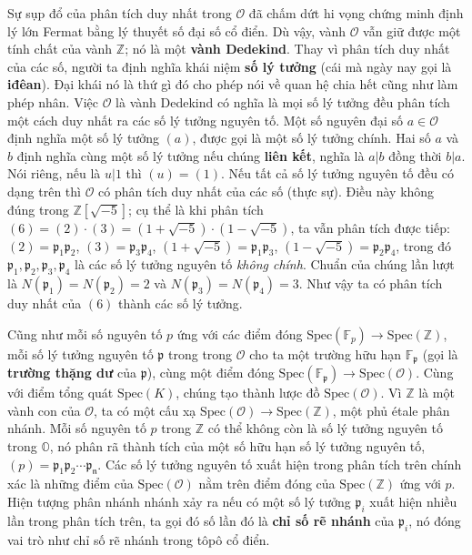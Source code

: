 \documentclass[12pt]{article}
\begin{document}
Sự sụp đổ của phân tích duy nhất trong $\mathcal{O}$ đã chấm dứt hi vọng chứng minh định lý lớn Fermat bằng lý thuyết số đại số cổ điển. Dù vậy, vành $\mathcal{O}$ vẫn giữ được một tính chất của vành $\mathbb{Z}$; nó là một {\bf vành Dedekind}. Thay vì phân tích duy nhất của các số, người ta định nghĩa khái niệm {\bf số lý tưởng} (cái mà ngày nay gọi là {\bf iđêan}). Đại khái nó là thứ gì đó cho phép nói về quan hệ chia hết cũng như làm phép nhân. Việc $\mathcal{O}$ là vành Dedekind có nghĩa là mọi số lý tưởng đều phân tích một cách duy nhất ra các số lý tưởng nguyên tố. Một số nguyên đại số $a \in \mathcal{O}$ định nghĩa một số lý tưởng $(a)$, được gọi là một số lý tưởng chính. Hai số $a$ và $b$ định nghĩa cùng một số lý tưởng nếu chúng {\bf liên kết}, nghĩa là $a|b$ đồng thời $b|a$. Nói riêng, nếu là $u|1$ thì $(u) = (1)$. Nếu tất cả số lý tưởng nguyên tố đều có dạng trên thì $\mathcal{O}$ có phân tích duy nhất của các số (thực sự). Điều này không đúng trong $\mathbb{Z}[\sqrt{-5}]$; cụ thể là khi phân tích $(6) = (2) \cdot (3) = (1 + \sqrt{-5}) \cdot (1 - \sqrt{-5})$, ta vẫn phân tích được tiếp: $(2) = \mathfrak{p}_1\mathfrak{p}_2$, $(3) = \mathfrak{p}_3\mathfrak{p}_4$, $(1 + \sqrt{-5}) = \mathfrak{p}_1\mathfrak{p}_3$, $(1 - \sqrt{-5}) = \mathfrak{p}_2\mathfrak{p}_4$, trong đó $\mathfrak{p}_1, \mathfrak{p}_2, \mathfrak{p}_3, \mathfrak{p}_4$ là các số lý tưởng nguyên tố {\it không chính}. Chuẩn của chúng lần lượt là $N(\mathfrak{p}_1) = N(\mathfrak{p}_2) = 2$ và $N(\mathfrak{p}_3) = N(\mathfrak{p}_4) = 3$. Như vậy ta có phân tích duy nhất của $(6)$ thành các số lý tưởng.

Cũng như mỗi số nguyên tố $p$ ứng với các điểm đóng $\text{Spec}(\mathbb{F}_p) \to \text{Spec}(\mathbb{Z})$, mỗi số lý tưởng nguyên tố $\mathfrak{p}$ trong trong $\mathcal{O}$ cho ta một trường hữu hạn $\mathbb{F}_{\mathfrak{p}}$ (gọi là {\bf trường thặng dư} của $\mathfrak{p}$), cùng một điểm đóng $\text{Spec}(\mathbb{F}_{\mathfrak{p}}) \to \text{Spec}(\mathcal{O})$. Cùng với điểm tổng quát $\text{Spec}(K)$, chúng tạo thành lược đồ $\text{Spec}(\mathcal{O})$. Vì $\mathbb{Z}$ là một vành con của $\mathcal{O}$, ta có một cấu xạ $\text{Spec}(\mathcal{O}) \to \text{Spec}(\mathbb{Z})$, một phủ étale phân nhánh. Mỗi số nguyên tố $p$ trong $\mathbb{Z}$ có thể không còn là số lý tưởng nguyên tố trong $\mathbb{O}$, nó phân rã thành tích của một số hữu hạn số lý tưởng nguyên tố, $(p) = \mathfrak{p_1}\mathfrak{p_2}\cdots\mathfrak{p_n}$. Các số lý tưởng nguyên tố xuất hiện trong phân tích trên chính xác là những điểm của $\text{Spec}(\mathcal{O})$ nằm trên điểm đóng của $\text{Spec}(\mathbb{Z})$ ứng với $p$. Hiện tượng phân nhánh nhánh xảy ra nếu có một số lý tưởng $\mathfrak{p}_i$ xuất hiện nhiều lần trong phân tích trên, ta gọi đó số lần đó là {\bf chỉ số rẽ nhánh} của $\mathfrak{p}_i$, nó đóng vai trò như chỉ số rẽ nhánh trong tôpô cổ điển.
\end{document}
